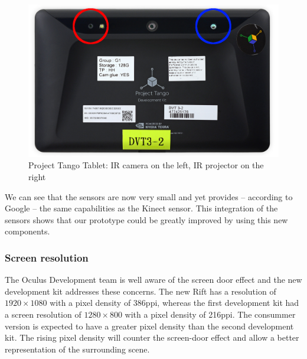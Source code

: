 \documentclass[12pt, twoside]{article}
\begin{document}
\begin{figure}[!h]
  \centering
  \includegraphics[scale=0.27]{TangoTab.jpeg}
  \caption{\label{fig:tangotablet} Project Tango Tablet: IR camera on the left, IR projector on the right\protect\footnotemark}
\end{figure}

We can see that the sensors are now very small and yet provides -- according to Google -- the same capabilities as the Kinect sensor. This integration of the sensors shows that our prototype could be greatly improved by using this new components.

\subsubsection{Screen resolution}
The Oculus Development team is well aware of the screen door effect and the new development kit addresses these concerns. The new Rift has a resolution of $1920\times 1080$ with a pixel density of 386ppi, whereas the first development kit had a screen resolution of $1280\times 800$ with a pixel density of 216ppi. The consummer version is expected to have a greater pixel density than the second development kit. The rising pixel density will counter the screen-door effect and allow a better representation of the surrounding scene.
\end{document}
